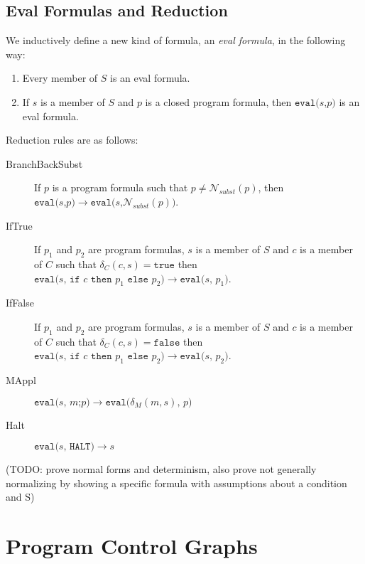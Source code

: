 \documentclass[11pt]{article}
\begin{document}
\subsection{Eval Formulas and Reduction}

We inductively define a new kind of formula, an \emph{eval formula}, in the following way:

\begin{enumerate}
\item Every member of $S$ is an eval formula.
\item If $s$ is a member of $S$ and $p$ is a closed program formula, then $\texttt{eval(}s\texttt{,} p\texttt{)}$ is an eval formula.
\end{enumerate}

Reduction rules are as follows:

\begin{description}
\item[BranchBackSubst] If $p$ is a program formula such that $p \neq \mathcal{N}_{subst}(p)$, then $\texttt{eval(}s\texttt{,} p\texttt{)} \longrightarrow \texttt{eval(}s\texttt{,} \mathcal{N}_{subst}(p)\texttt{)}$.
\item[IfTrue] If $p_{1}$ and $p_{2}$ are program formulas, $s$ is a member of $S$ and $c$ is a member of $C$ such that $\delta_{C}(c, s) = \texttt{true}$ then \\ $\texttt{eval(} s \texttt{, } \texttt{if } c \texttt{ then } p_{1} \texttt{ else } p_{2} \texttt{)} \longrightarrow \texttt{eval(} s \texttt{, } p_{1} \texttt{)}$.
\item[IfFalse] If $p_{1}$ and $p_{2}$ are program formulas, $s$ is a member of $S$ and $c$ is a member of $C$ such that $\delta_{C}(c, s) = \texttt{false}$ then \\ $\texttt{eval(} s \texttt{, } \texttt{if } c \texttt{ then } p_{1} \texttt{ else } p_{2} \texttt{)} \longrightarrow \texttt{eval(} s \texttt{, } p_{2} \texttt{)}$.
\item[MAppl] $\texttt{eval(}s\texttt{, } m\texttt{;}p \texttt{)} \longrightarrow \texttt{eval(} \delta_{M}(m, s)\texttt{, } p \texttt{)}$
\item[Halt] $\texttt{eval(}s\texttt{, } \texttt{HALT)} \longrightarrow s$
\end{description}


(TODO: prove normal forms and determinism, also prove not generally normalizing by showing a specific formula with assumptions about a condition and S)

\section{Program Control Graphs}
\end{document}
